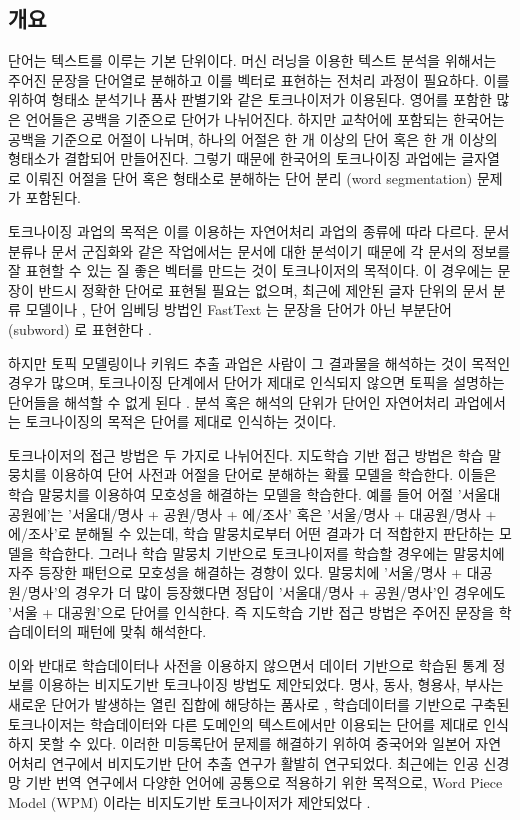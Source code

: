 \documentclass[11pt]{article}
\begin{document}
\subsection{개요}
단어는 텍스트를 이루는 기본 단위이다.
머신 러닝을 이용한 텍스트 분석을 위해서는 주어진 문장을 단어열로 분해하고 이를 벡터로 표현하는 전처리 과정이 필요하다.
이를 위하여 형태소 분석기나 품사 판별기와 같은 토크나이저가 이용된다.
영어를 포함한 많은 언어들은 공백을 기준으로 단어가 나뉘어진다.
하지만 교착어에 포함되는 한국어는 공백을 기준으로 어절이 나뉘며, 하나의 어절은 한 개 이상의 단어 혹은 한 개 이상의 형태소가 결합되어 만들어진다.
그렇기 때문에 한국어의 토크나이징 과업에는 글자열로 이뤄진 어절을 단어 혹은 형태소로 분해하는 단어 분리 (word segmentation) 문제가 포함된다.

토크나이징 과업의 목적은 이를 이용하는 자연어처리 과업의 종류에 따라 다르다.
문서 분류나 문서 군집화와 같은 작업에서는 문서에 대한 분석이기 때문에 각 문서의 정보를 잘 표현할 수 있는 질 좋은 벡터를 만드는 것이 토크나이저의 목적이다.
이 경우에는 문장이 반드시 정확한 단어로 표현될 필요는 없으며, 최근에 제안된 글자 단위의 문서 분류 모델이나 \citep{zhang2015character}, 단어 임베딩 방법인 FastText 는 문장을 단어가 아닌 부분단어 (subword) 로 표현한다 \citep{bojanowski2016enriching, joulin2016bag}.

하지만 토픽 모델링이나 키워드 추출 과업은 사람이 그 결과물을 해석하는 것이 목적인 경우가 많으며, 토크나이징 단계에서 단어가 제대로 인식되지 않으면 토픽을 설명하는 단어들을 해석할 수 없게 된다 \citep{hall2008studying}.
분석 혹은 해석의 단위가 단어인 자연어처리 과업에서는 토크나이징의 목적은 단어를 제대로 인식하는 것이다.

토크나이저의 접근 방법은 두 가지로 나뉘어진다.
지도학습 기반 접근 방법은 학습 말뭉치를 이용하여 단어 사전과 어절을 단어로 분해하는 확률 모델을 학습한다.
이들은 학습 말뭉치를 이용하여 모호성을 해결하는 모델을 학습한다.
예를 들어 어절 '서울대공원에'는 '서울대/명사 + 공원/명사 + 에/조사' 혹은 '서울/명사 + 대공원/명사 + 에/조사'로 분해될 수 있는데, 학습 말뭉치로부터 어떤 결과가 더 적합한지 판단하는 모델을 학습한다.
그러나 학습 말뭉치 기반으로 토크나이저를 학습할 경우에는 말뭉치에 자주 등장한 패턴으로 모호성을 해결하는 경향이 있다.
말뭉치에 '서울/명사 + 대공원/명사'의 경우가 더 많이 등장했다면 정답이 '서울대/명사 + 공원/명사'인 경우에도 '서울 + 대공원'으로 단어를 인식한다.
즉 지도학습 기반 접근 방법은 주어진 문장을 학습데이터의 패턴에 맞춰 해석한다.

이와 반대로 학습데이터나 사전을 이용하지 않으면서 데이터 기반으로 학습된 통계 정보를 이용하는 비지도기반 토크나이징 방법도 제안되었다.
명사, 동사, 형용사, 부사는 새로운 단어가 발생하는 열린 집합에 해당하는 품사로 \citep{jurafsky2000speech}, 학습데이터를 기반으로 구축된 토크나이저는 학습데이터와 다른 도메인의 텍스트에서만 이용되는 단어를 제대로 인식하지 못할 수 있다.
이러한 미등록단어 문제를 해결하기 위하여 중국어와 일본어 자연어처리 연구에서 비지도기반 단어 추출 연구가 활발히 연구되었다.
최근에는 인공 신경망 기반 번역 연구에서 다양한 언어에 공통으로 적용하기 위한 목적으로, Word Piece Model (WPM) 이라는 비지도기반 토크나이저가 제안되었다 \citep{sennrich2015neural}.
\end{document}
